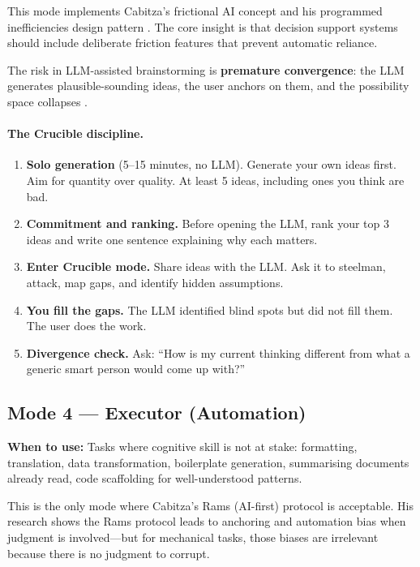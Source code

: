 \documentclass[11pt,a4paper]{article}
\begin{document}
This mode implements Cabitza's frictional AI concept and his programmed
inefficiencies design pattern \citep{cabitza2019programmed}. The core insight is
that decision support systems should include deliberate friction features that
prevent automatic reliance.

The risk in LLM-assisted brainstorming is \textbf{premature convergence}: the LLM
generates plausible-sounding ideas, the user anchors on them, and the possibility
space collapses \citep{doshi2024creativity}.

\paragraph{The Crucible discipline.}
\begin{enumerate}
    \item \textbf{Solo generation} (5--15 minutes, no LLM). Generate your own
    ideas first. Aim for quantity over quality. At least 5 ideas, including ones
    you think are bad.
    \item \textbf{Commitment and ranking.} Before opening the LLM, rank your top
    3 ideas and write one sentence explaining why each matters.
    \item \textbf{Enter Crucible mode.} Share ideas with the LLM. Ask it to
    steelman, attack, map gaps, and identify hidden assumptions.
    \item \textbf{You fill the gaps.} The LLM identified blind spots but did not
    fill them. The user does the work.
    \item \textbf{Divergence check.} Ask: ``How is my current thinking different
    from what a generic smart person would come up with?''
\end{enumerate}

\subsection{Mode 4 --- Executor (Automation)}

\textbf{When to use:} Tasks where cognitive skill is not at stake: formatting,
translation, data transformation, boilerplate generation, summarising documents
already read, code scaffolding for well-understood patterns.

This is the only mode where Cabitza's Rams (AI-first) protocol is acceptable. His
research shows the Rams protocol leads to anchoring and automation bias when
judgment is involved---but for mechanical tasks, those biases are irrelevant
because there is no judgment to corrupt.
\end{document}
